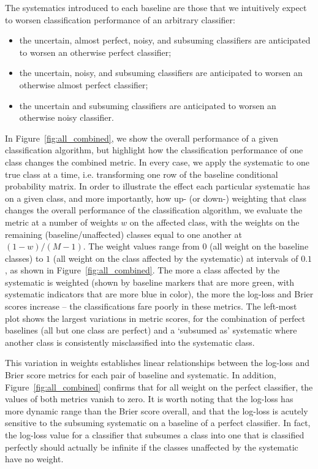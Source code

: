 The systematics introduced to each baseline are those that we intuitively expect to worsen classification performance of an arbitrary classifier:
\begin{itemize}
\item the uncertain, almost perfect, noisy, and subsuming classifiers are anticipated to worsen an otherwise perfect classifier;
\item the uncertain, noisy, and subsuming classifiers are anticipated to worsen an otherwise almost perfect classifier;
\item the uncertain and subsuming classifiers are anticipated to worsen an otherwise noisy classifier.
\end{itemize}
In Figure~\ref{fig:all_combined}, we show the overall performance of a given classification algorithm, but highlight how the classification performance of one class changes the combined metric. In every case, we apply the systematic to one true class at a time, i.e. transforming one row of the baseline conditional probability matrix. 
In order to illustrate the effect each particular systematic has on a given class, and more importantly, how up- (or down-) weighting that class changes the overall performance of the classification algorithm, we evaluate the metric at a number of weights $w$ on the affected class, with the weights on the remaining (baseline/unaffected) classes equal to one another at $(1 - w) / (M - 1)$.
The weight values range from $0$ (all weight on the baseline classes) to $1$ (all weight on the class affected by the systematic) at intervals of $0.1$, as shown in Figure~\ref{fig:all_combined}. The more a class affected by the systematic is weighted (shown by baseline markers that are more green, with systematic indicators that are more blue in color), the more the log-loss and Brier scores increase -- the classifications fare poorly in these metrics. The left-most plot shows the largest variations in metric scores, for the combination of perfect baselines (all but one class are perfect) and a `subsumed as' systematic where another class is consistently misclassified into the systematic class. 

This variation in weights establishes linear relationships between the log-loss and Brier score metrics for each pair of baseline and systematic. In addition, Figure~\ref{fig:all_combined} confirms that for all weight on the perfect classifier, the values of both metrics vanish to zero. It is worth noting that the log-loss has more dynamic range than the Brier score overall, and that the log-loss is acutely sensitive to the subsuming systematic on a baseline of a perfect classifier. In fact, the log-loss value for a classifier that subsumes a class into one that is classified perfectly should actually be infinite if the classes unaffected by the systematic have no weight.

